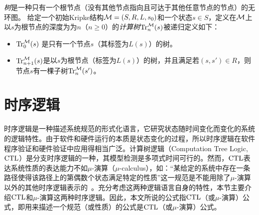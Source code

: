 \emph{树}是一种只有一个根节点（没有其他节点指向且可达于其他任意节点的节点）的无环图。
给定一个初始Kripke结构${\cal M}=(S,R,L,s_0)$和一个状态$s\in S$，定义在${\cal M}$上以$s$为根节点的深度为为$n$（$n\ge 0$）的\emph{计算树}$\textrm{Tr}_n^{{\cal M}}(s)$被递归定义如下\cite{browne1988characterizing}：
\begin{itemize}
	\item $\textrm{Tr}_0^{{\cal M}}(s)$ 是只有一个节点$s$（其标签为$L(s)$）的树。
	\item $\textrm{Tr}_{n+1}^{{\cal M}}(s)$是以$s$为根节点（标签为$L(s)$）的树，并且满足若$(s,s')\in R$，则节点$s$有一棵子树$\textrm{Tr}_{n}^{{\cal M}}(s')$。
\end{itemize}




\section{时序逻辑}
时序逻辑是一种描述系统规范的形式化语言，它研究状态随时间变化而变化的系统的逻辑特性。由于软件和硬件运行的本质是状态变化的过程，所以时序逻辑在软件程序验证和硬件验证中应用得相当广泛。计算树逻辑（Computation Tree Logic, $\textrm{CTL}$）是分支时序逻辑的一种，其模型检测是多项式时间可行的。然而，$\textrm{CTL}$表达系统性质的表达能力不如$\mu$-演算（$\mu$-calculus），如：“某给定的系统中存在一条路径使得该路径上的第偶数个状态满足特定的性质”这一规范是不能用除了$\mu$-演算以外的其他时序逻辑表示的~\cite{DBLP:series/txtcs/Schneider04}。充分考虑这两种逻辑语言自身的特性，本节主要介绍$\textrm{CTL}$和$\mu$-演算这两种时序逻辑。因此，本文所说的公式指$\textrm{CTL}$（或$\mu$-演算）公式，即用来描述一个规范（或性质）的公式是$\textrm{CTL}$（或$\mu$-演算）公式。

